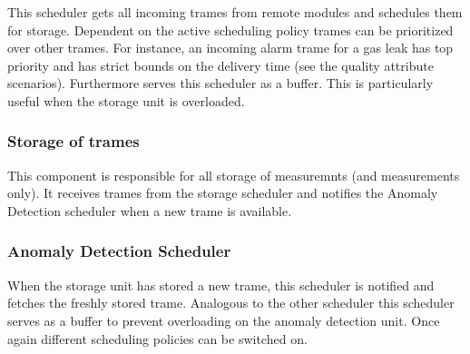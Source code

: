 \npar This scheduler gets all incoming trames from remote modules and schedules
them for storage. Dependent on the active scheduling policy trames can be
prioritized over other trames. For instance, an incoming alarm trame for a gas
leak has top priority and has strict bounds on the delivery time (see the
quality attribute scenarios). Furthermore serves this scheduler as a buffer.
This is particularly useful when the storage unit is overloaded.


\subsubsection{Storage of trames}

\npar This component is responsible for all storage of measuremnts (and
measurements only). It receives trames from the storage scheduler and notifies
the Anomaly Detection scheduler when a new trame is available.


\subsubsection{Anomaly Detection Scheduler}

\npar When the storage unit has stored a new trame, this scheduler is notified
and fetches the freshly stored trame. Analogous to the other scheduler this
scheduler serves as a buffer to prevent overloading on the anomaly detection
unit. Once again different scheduling policies can be switched on.

